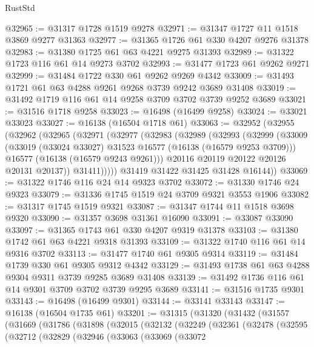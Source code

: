 \begin{lexlean}{RustStd}
\begin{coremodule}
@32965 := @31317 @1728 @1519 @9278
@32971 := @31347 @1727 @11 @1518 @3869 @9277 @31363
@32977 := @31365 @1726 @61 @330 @4207 @9276 @31378
@32983 := @31380 @1725 @61 @63 @4221 @9275 @31393
@32989 := @31322 @1723 @116 @61 @14 @9273 @3702
@32993 := @31477 @1723 @61 @9262 @9271
@32999 := @31484 @1722 @330 @61 @9262 @9269 @4342
@33009 := @31493 @1721 @61 @63 @4288 @9261 @9268 @3739 @9242 @3689 @31408
@33019 := @31492 @1719 @116 @61 @14 @9258 @3709 @3702 @3739 @9252 @3689
@33021 := @31516 @1718 @9258
@33023 := @16498 (@16499 @9258)
@33024 := @33021 @33023
@33027 := @16138 (@16504 @1718 @61)
@33063 := @32952
    (@32955
      (@32962
        (@32965
          (@32971
            (@32977
              (@32983
                (@32989
                  (@32993
                    (@32999
                      (@33009
                        (@33019 (@33024 @33027) @31523 @16577 (@16138 (@16579 @9253 @3709)))
                        @16577
                        (@16138 (@16579 @9243 @9261)))
                      @20116
                      @20119
                      @20122
                      @20126
                      @20131
                      @20137))
                  @31411)))))
        @31419
        @31422
        @31425
        @31428
        @16144))
@33069 := @31322 @1746 @116 @24 @14 @9323 @3702
@33072 := @31330 @1746 @24 @9323
@33079 := @31336 @1745 @1519 @24 @3709 @9321 @3553 @1906
@33082 := @31317 @1745 @1519 @9321
@33087 := @31347 @1744 @11 @1518 @3698 @9320
@33090 := @31357 @3698 @31361 @16090
@33091 := @33087 @33090
@33097 := @31365 @1743 @61 @330 @4207 @9319 @31378
@33103 := @31380 @1742 @61 @63 @4221 @9318 @31393
@33109 := @31322 @1740 @116 @61 @14 @9316 @3702
@33113 := @31477 @1740 @61 @9305 @9314
@33119 := @31484 @1739 @330 @61 @9305 @9312 @4342
@33129 := @31493 @1738 @61 @63 @4288 @9304 @9311 @3739 @9285 @3689 @31408
@33139 := @31492 @1736 @116 @61 @14 @9301 @3709 @3702 @3739 @9295 @3689
@33141 := @31516 @1735 @9301
@33143 := @16498 (@16499 @9301)
@33144 := @33141 @33143
@33147 := @16138 (@16504 @1735 @61)
@33201 := @31315
    (@31320
      (@31432
        (@31557
          (@31669
            (@31786
              (@31898
                (@32015
                  (@32132
                    (@32249
                      (@32361
                        (@32478
                          (@32595
                            (@32712
                              (@32829
                                (@32946
                                  (@33063
                                    (@33069
                                      (@33072

\end{coremodule}
\end{lexlean}
